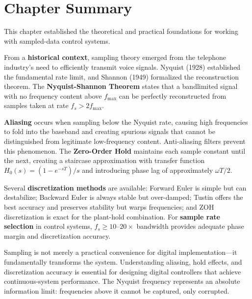 \section{Chapter Summary}
\label{sec:summary}

This chapter established the theoretical and practical foundations for working with sampled-data control systems.

From a \textbf{historical context}, sampling theory emerged from the telephone industry's need to efficiently transmit voice signals. Nyquist (1928) established the fundamental rate limit, and Shannon (1949) formalized the reconstruction theorem. The \textbf{Nyquist-Shannon Theorem} states that a bandlimited signal with no frequency content above $f_{\max}$ can be perfectly reconstructed from samples taken at rate $f_s > 2f_{\max}$.

\textbf{Aliasing} occurs when sampling below the Nyquist rate, causing high frequencies to fold into the baseband and creating spurious signals that cannot be distinguished from legitimate low-frequency content. Anti-aliasing filters prevent this phenomenon. The \textbf{Zero-Order Hold} maintains each sample constant until the next, creating a staircase approximation with transfer function $H_0(s) = (1 - e^{-sT})/s$ and introducing phase lag of approximately $\omega T/2$.

Several \textbf{discretization methods} are available: Forward Euler is simple but can destabilize; Backward Euler is always stable but over-damped; Tustin offers the best accuracy and preserves stability but warps frequencies; and ZOH discretization is exact for the plant-hold combination. For \textbf{sample rate selection} in control systems, $f_s \geq 10$--$20 \times$ bandwidth provides adequate phase margin and discretization accuracy.

\begin{tcolorbox}[colback=yellow!10!white,colframe=orange!75!black,sharp corners,title=Key Takeaway]
Sampling is not merely a practical convenience for digital implementation---it fundamentally transforms the system. Understanding aliasing, hold effects, and discretization accuracy is essential for designing digital controllers that achieve continuous-system performance. The Nyquist frequency represents an absolute information limit: frequencies above it cannot be captured, only corrupted.
\end{tcolorbox}

